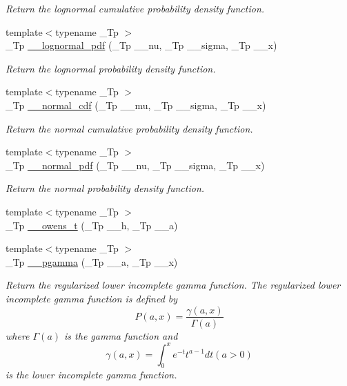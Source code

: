 \begin{DoxyCompactItemize}
\begin{DoxyCompactList}\small\item\em Return the lognormal cumulative probability density function. \end{DoxyCompactList}\item 
{\footnotesize template$<$typename \+\_\+\+Tp $>$ }\\\+\_\+\+Tp \hyperlink{namespacestd_1_1____detail_a46c5dea7a38f38965bce5a84d389a02b}{\+\_\+\+\_\+lognormal\+\_\+pdf} (\+\_\+\+Tp \+\_\+\+\_\+nu, \+\_\+\+Tp \+\_\+\+\_\+sigma, \+\_\+\+Tp \+\_\+\+\_\+x)
\begin{DoxyCompactList}\small\item\em Return the lognormal probability density function. \end{DoxyCompactList}\item 
{\footnotesize template$<$typename \+\_\+\+Tp $>$ }\\\+\_\+\+Tp \hyperlink{namespacestd_1_1____detail_a718b0f0884f0bc91b038ef4dabbb7427}{\+\_\+\+\_\+normal\+\_\+cdf} (\+\_\+\+Tp \+\_\+\+\_\+mu, \+\_\+\+Tp \+\_\+\+\_\+sigma, \+\_\+\+Tp \+\_\+\+\_\+x)
\begin{DoxyCompactList}\small\item\em Return the normal cumulative probability density function. \end{DoxyCompactList}\item 
{\footnotesize template$<$typename \+\_\+\+Tp $>$ }\\\+\_\+\+Tp \hyperlink{namespacestd_1_1____detail_a622d27a8ea564d1299ebd5eb81a5fd21}{\+\_\+\+\_\+normal\+\_\+pdf} (\+\_\+\+Tp \+\_\+\+\_\+nu, \+\_\+\+Tp \+\_\+\+\_\+sigma, \+\_\+\+Tp \+\_\+\+\_\+x)
\begin{DoxyCompactList}\small\item\em Return the normal probability density function. \end{DoxyCompactList}\item 
{\footnotesize template$<$typename \+\_\+\+Tp $>$ }\\\+\_\+\+Tp \hyperlink{namespacestd_1_1____detail_a5b50a9d8beaca5a637c8293ab01bf124}{\+\_\+\+\_\+owens\+\_\+t} (\+\_\+\+Tp \+\_\+\+\_\+h, \+\_\+\+Tp \+\_\+\+\_\+a)
\item 
{\footnotesize template$<$typename \+\_\+\+Tp $>$ }\\\+\_\+\+Tp \hyperlink{namespacestd_1_1____detail_a009273f90a2496eb24abf92cd957b851}{\+\_\+\+\_\+pgamma} (\+\_\+\+Tp \+\_\+\+\_\+a, \+\_\+\+Tp \+\_\+\+\_\+x)
\begin{DoxyCompactList}\small\item\em Return the regularized lower incomplete gamma function. The regularized lower incomplete gamma function is defined by \[ P(a,x) = \frac{\gamma(a,x)}{\Gamma(a)} \] where $ \Gamma(a) $ is the gamma function and \[ \gamma(a,x) = \int_0^x e^{-t}t^{a-1}dt (a > 0) \] is the lower incomplete gamma function. \end{DoxyCompactList}\item 

\end{DoxyCompactItemize}
